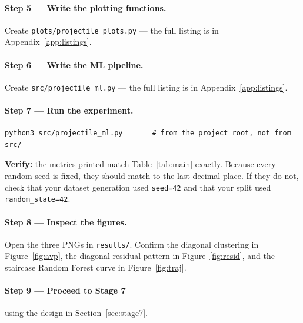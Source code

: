 \documentclass[11pt,a4paper]{article}
\begin{document}
\paragraph{Step 5 --- Write the plotting functions.}
Create \texttt{plots/projectile\_plots.py} --- the full listing is in Appendix~\ref{app:listings}.

\paragraph{Step 6 --- Write the ML pipeline.}
Create \texttt{src/projectile\_ml.py} --- the full listing is in Appendix~\ref{app:listings}.

\paragraph{Step 7 --- Run the experiment.}
\begin{lstlisting}[style=shellstyle,numbers=none]
python3 src/projectile_ml.py       # from the project root, not from src/
\end{lstlisting}
\textbf{Verify:} the metrics printed match Table~\ref{tab:main} exactly. Because every random seed is
fixed, they should match to the last decimal place. If they do not, check that your dataset
generation used \texttt{seed=42} and that your split used \texttt{random\_state=42}.

\paragraph{Step 8 --- Inspect the figures.}
Open the three PNGs in \texttt{results/}. Confirm the diagonal clustering in
Figure~\ref{fig:avp}, the diagonal residual pattern in Figure~\ref{fig:resid}, and the staircase
Random Forest curve in Figure~\ref{fig:traj}.

\paragraph{Step 9 --- Proceed to Stage 7} using the design in Section~\ref{sec:stage7}.
\end{document}
